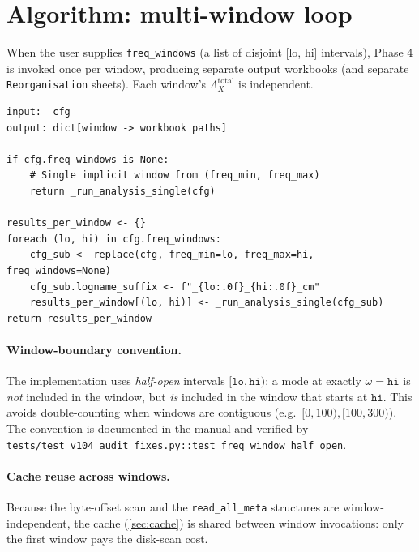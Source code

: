 \documentclass[10pt,a4paper,twoside]{article}
\newcommand{\codref}[1]{%
  \quad\text{\textcolor{gray!70!black}{\footnotesize $\rightsquigarrow$~\texttt{#1}}}}
\newcommand{\fn}[1]{\texttt{#1}}
\newcommand{\cfgkey}[1]{\texttt{#1}}
\begin{document}
\section{Algorithm: multi-window loop}
\label{sec:algo-multi-window}

\codref{runner.run\_analysis}

When the user supplies \cfgkey{freq\_windows} (a list of disjoint
[lo, hi] intervals), Phase 4 is invoked once per window, producing
separate output workbooks (and separate \texttt{Reorganisation}
sheets). Each window's $\Lambda_X^\text{total}$ is independent.

\begin{lstlisting}[style=pseudo,
  caption={Multi-window dispatching. Implementation:
           \protect\fn{runner.run\_analysis}.}]
input:  cfg
output: dict[window -> workbook paths]

if cfg.freq_windows is None:
    # Single implicit window from (freq_min, freq_max)
    return _run_analysis_single(cfg)

results_per_window <- {}
foreach (lo, hi) in cfg.freq_windows:
    cfg_sub <- replace(cfg, freq_min=lo, freq_max=hi, freq_windows=None)
    cfg_sub.logname_suffix <- f"_{lo:.0f}_{hi:.0f}_cm"
    results_per_window[(lo, hi)] <- _run_analysis_single(cfg_sub)
return results_per_window
\end{lstlisting}

\paragraph{Window-boundary convention.}
The implementation uses \emph{half-open} intervals
$[\texttt{lo}, \texttt{hi})$: a mode at exactly $\omega = \texttt{hi}$
is \emph{not} included in the window, but \emph{is} included in the
window that starts at $\texttt{hi}$. This avoids double-counting
when windows are contiguous (e.g.\ $[0, 100), [100, 300)$). The
convention is documented in the manual and verified by
\fn{tests/test\_v104\_audit\_fixes.py::test\_freq\_window\_half\_open}.

\paragraph{Cache reuse across windows.}
Because the byte-offset scan and the \fn{read\_all\_meta} structures
are window-independent, the cache (\cref{sec:cache}) is shared
between window invocations: only the first window pays the
disk-scan cost.
\end{document}
